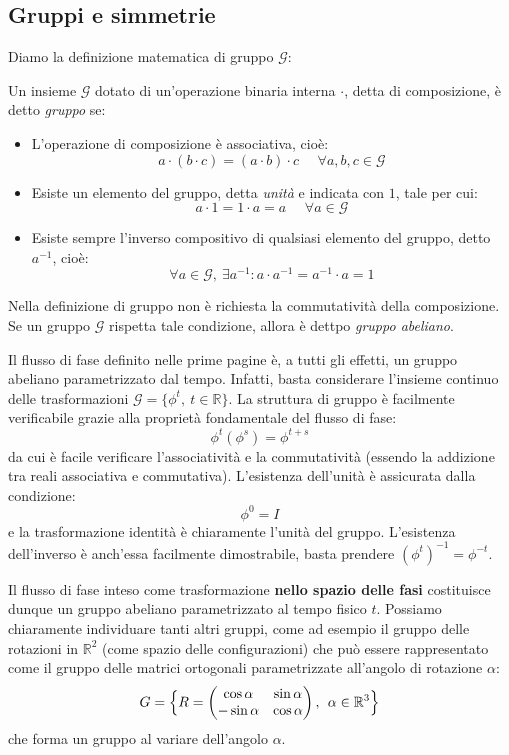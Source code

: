 \documentclass[a4paper,openany]{article}
\begin{document}
	\subsection{Gruppi e simmetrie}
	Diamo la definizione matematica di gruppo $\mathcal{G}$:
	\begin{tcolorbox}
		Un insieme $\mathcal{G}$ dotato di un'operazione binaria interna $\cdot$, detta di composizione, è detto \textit{gruppo} se:
		\begin{itemize}
			\item L'operazione di composizione è associativa, cioè:
			$$
			a\cdot(b\cdot c) = (a\cdot b)\cdot c \>\>\>\>\>\> \forall a,b,c \in \mathcal{G}
			$$
			\item Esiste un elemento del gruppo, detta \textit{unità} e indicata con $1$, tale per cui:
			$$
			a\cdot 1 = 1\cdot a = a \>\>\>\>\>\> \forall a \in \mathcal{G}
			$$
			\item Esiste sempre l'inverso compositivo di qualsiasi elemento del gruppo, detto $a^{-1}$, cioè:
			$$
			\forall a \in \mathcal{G}, \> \exists a^{-1} : a\cdot a^{-1} = a^{-1}\cdot a = 1
			$$
		\end{itemize}
	\end{tcolorbox}
	Nella definizione di gruppo non è richiesta la commutatività della composizione. Se un gruppo $\mathcal{G}$ rispetta tale condizione, allora è dettpo \textit{gruppo abeliano}.
	
	Il flusso di fase definito nelle prime pagine è, a tutti gli effetti, un gruppo abeliano parametrizzato dal tempo. Infatti, basta considerare l'insieme continuo delle trasformazioni $\mathcal{G} = \{\phi^{t}, \> t\in \mathbb{R}\}$. La struttura di gruppo è facilmente verificabile grazie alla proprietà fondamentale del flusso di fase:
	$$
	\phi^{t}(\phi^{s}) = \phi^{t+s}
	$$
	da cui è facile verificare l'associatività e la commutatività (essendo la addizione tra reali associativa e commutativa). L'esistenza dell'unità è assicurata dalla condizione:
	$$
	\phi^{0} = I
	$$
	e la trasformazione identità è chiaramente l'unità del gruppo. L'esistenza dell'inverso è anch'essa facilmente dimostrabile, basta prendere $(\phi^{t})^{-1} = \phi^{-t}$.
	
	Il flusso di fase inteso come trasformazione \textbf{nello spazio delle fasi} costituisce dunque un gruppo abeliano parametrizzato al tempo fisico $t$. Possiamo chiaramente individuare tanti altri gruppi, come ad esempio il gruppo delle rotazioni in $\mathbb{R}^{2}$ (come spazio delle configurazioni) che può essere rappresentato come il gruppo delle matrici ortogonali parametrizzate all'angolo di rotazione $\alpha$:
	\begin{equation}
		G = \Bigl\{
		R = 
		\begin{pmatrix}
			\cos\alpha & \sin\alpha \\
			-\sin\alpha & \cos\alpha
		\end{pmatrix}
		,\>\> \alpha \in \mathbb{R}^{3}
		\Bigl\}
	\end{equation}
	che forma un gruppo al variare dell'angolo $\alpha$.
	
\end{document}
